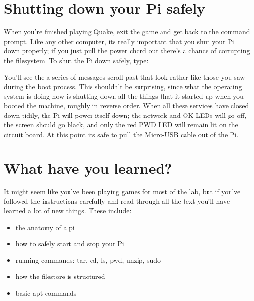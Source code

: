 \FloatBarrier
\section{Shutting down your Pi safely}
\label{section:shutdown}

When you're finished playing Quake, exit the game and get back to the command prompt. Like any other computer, its really important that you shut your Pi down properly; if you just pull the power chord out there's a chance of corrupting the filesystem. To shut the Pi down safely, type:


\noindent You'll see the a series of messages scroll past that look rather like those you saw during the boot process. This shouldn't be surprising, since what the operating system is doing now is shutting down all the things that it started up when you booted the machine, roughly in reverse order. When all these services have closed down tidily, the Pi will power itself down; the network and OK LEDs will go off, the screen should go black, and only the red PWD LED will remain lit on the circuit board. At this point its safe to pull the Micro-USB cable out of the Pi. 

\FloatBarrier
\section{What have you learned?}

It might seem like you've been playing games for most of the lab, but if you've followed the instructions carefully and read through all the text you'll have learned a lot of new things. These include:
\begin{itemize}
\item the anatomy of a pi
\item how to safely start and stop your Pi
\item running commands: tar, cd, ls, pwd, unzip, sudo
\item how the filestore is structured
\item basic apt commands
\end{itemize}

